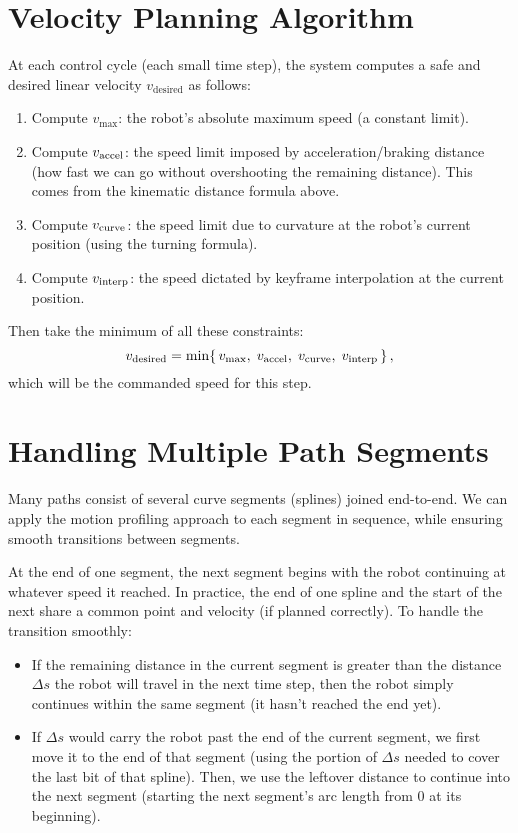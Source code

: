 \documentclass[11pt]{article}
\begin{document}
\section{Velocity Planning Algorithm}

At each control cycle (each small time step), the system computes a safe and desired linear velocity $v_{\text{desired}}$ as follows:
\begin{enumerate}
  \item Compute \(v_{\max}\): the robot’s absolute maximum speed (a constant limit).
  \item Compute \(v_{\rm accel}\): the speed limit imposed by acceleration/braking distance (how fast we can go without overshooting the remaining distance). This comes from the kinematic distance formula above.
  \item Compute \(v_{\rm curve}\): the speed limit due to curvature at the robot’s current position (using the turning formula).
  \item Compute \(v_{\rm interp}\): the speed dictated by keyframe interpolation at the current position.
\end{enumerate}
Then take the minimum of all these constraints:
\[
v_{\rm desired} = \min\{\,v_{\max},\;v_{\rm accel},\;v_{\rm curve},\;v_{\rm interp}\,\}\,,
\] 
which will be the commanded speed for this step.

\section{Handling Multiple Path Segments}

Many paths consist of several curve segments (splines) joined end-to-end. We can apply the motion profiling approach to each segment in sequence, while ensuring smooth transitions between segments.

At the end of one segment, the next segment begins with the robot continuing at whatever speed it reached. In practice, the end of one spline and the start of the next share a common point and velocity (if planned correctly). To handle the transition smoothly:
\begin{itemize}
  \item If the remaining distance in the current segment is greater than the distance $\Delta s$ the robot will travel in the next time step, then the robot simply continues within the same segment (it hasn't reached the end yet).
  \item If $\Delta s$ would carry the robot past the end of the current segment, we first move it to the end of that segment (using the portion of $\Delta s$ needed to cover the last bit of that spline). Then, we use the leftover distance to continue into the next segment (starting the next segment's arc length from 0 at its beginning).
\end{itemize}
\end{document}
